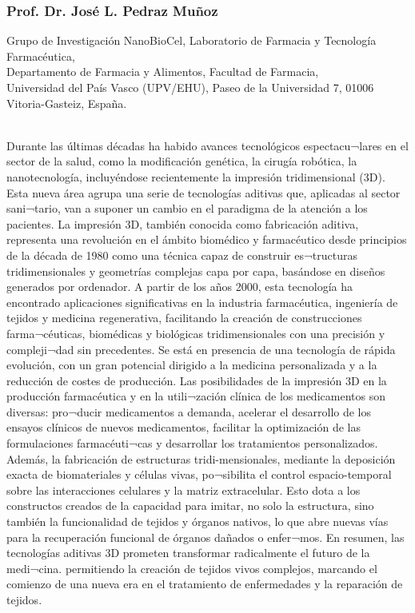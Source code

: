 \documentclass[11pt,a4paper]{article}
\begin{document}
{\centering
\subsubsection*{Prof. Dr. José L. Pedraz Muñoz}

\noindent Grupo de Investigación NanoBioCel, Laboratorio de Farmacia y Tecnología Farmacéutica, \\
Departamento de Farmacia y Alimentos, Facultad de Farmacia, \\
Universidad del País Vasco (UPV/EHU), Paseo de la Universidad 7, 01006 Vitoria-Gasteiz, España.} \\

\noindent
Durante las últimas décadas ha habido avances tecnológicos espectacu¬lares en el sector de la salud, como la modificación genética, la cirugía robótica, la nanotecnología, incluyéndose recientemente la impresión tridimensional (3D). Esta nueva área agrupa una serie de tecnologías aditivas que, aplicadas al sector sani¬tario, van a suponer un cambio en el paradigma de la atención a los pacientes. La impresión 3D, también conocida como fabricación aditiva, representa una revolución en el ámbito biomédico y farmacéutico desde principios de la década de 1980 como una técnica capaz de construir es¬tructuras tridimensionales y geometrías complejas capa por capa, basándose en diseños generados por ordenador. A partir de los años 2000, esta tecnología ha encontrado aplicaciones significativas en la industria farmacéutica, ingeniería de tejidos y medicina regenerativa, facilitando la creación de construcciones farma¬céuticas, biomédicas y biológicas tridimensionales con una precisión y compleji¬dad sin precedentes.  Se está en presencia de una tecnología de rápida evolución, con un gran potencial dirigido a la medicina personalizada y a la reducción de costes de producción. Las posibilidades de la impresión 3D en la producción farmacéutica y en la utili¬zación clínica de los medicamentos son diversas: pro¬ducir medicamentos a demanda, acelerar el desarrollo de los ensayos clínicos de nuevos medicamentos, facilitar la optimización de las formulaciones farmacéuti¬cas y desarrollar los tratamientos personalizados. Además, la fabricación de estructuras tridi-mensionales, mediante la deposición exacta de biomateriales y células vivas, po¬sibilita el control espacio-temporal sobre las interacciones celulares y la matriz extracelular. Esto dota a los constructos creados de la capacidad para imitar, no solo la estructura, sino también la funcionalidad de tejidos y órganos nativos, lo que abre nuevas vías para la recuperación funcional de órganos dañados o enfer¬mos. En resumen, las tecnologías aditivas 3D prometen transformar radicalmente el futuro de la medi¬cina. permitiendo la creación de tejidos vivos complejos, marcando el comienzo de una nueva era en el tratamiento de enfermedades y la reparación de tejidos. 
\end{document}
